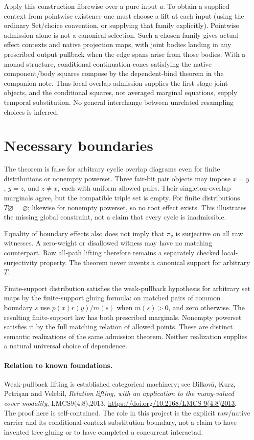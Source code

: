 \documentclass[11pt]{article}
\begin{document}
Apply this construction fibrewise over a pure input $a$. To obtain a supplied context from pointwise existence one must choose a lift at each input (using the ordinary Set/choice convention, or supplying that family explicitly). Pointwise admission alone is not a canonical selection. Such a chosen family gives actual effect contexts and native projection maps, with joint bodies landing in any prescribed output pullback when the edge spans arise from those bodies. With a monad structure, conditional continuation cones satisfying the native component/body squares compose by the dependent-bind theorem in the companion note. Thus local overlap admission supplies the first-stage joint objects, and the conditional squares, not averaged marginal equations, supply temporal substitution. No general interchange between unrelated resampling choices is inferred.

\section{Necessary boundaries}
The theorem is false for arbitrary cyclic overlap diagrams even for finite distributions or nonempty powerset. Three fair-bit pair objects may impose $x=y$, $y=z$, and $z\ne x$, each with uniform allowed pairs. Their singleton-overlap marginals agree, but the compatible triple set is empty. For finite distributions $T\varnothing=\varnothing$; likewise for nonempty powerset, so no root effect exists. This illustrates the missing global constraint, not a claim that every cycle is inadmissible.

Equality of boundary effects also does not imply that $\pi_v$ is surjective on all raw witnesses. A zero-weight or disallowed witness may have no matching counterpart. Raw all-path lifting therefore remains a separately checked local-surjectivity property. The theorem never invents a canonical support for arbitrary $T$.

Finite-support distribution satisfies the weak-pullback hypothesis for arbitrary set maps by the finite-support gluing formula: on matched pairs of common boundary $s$ use $p(x)r(y)/m(s)$ when $m(s)>0$, and zero otherwise. The resulting finite-support law has both prescribed marginals. Nonempty powerset satisfies it by the full matching relation of allowed points. These are distinct semantic realizations of the same admission theorem. Neither realization supplies a natural universal choice of dependence.

\paragraph{Relation to known foundations.} Weak-pullback lifting is established categorical machinery; see B\'ilkov\'a, Kurz, Petri\c{s}an and Velebil, \emph{Relation lifting, with an application to the many-valued cover modality}, LMCS9(4:8),2013, \url{https://doi.org/10.2168/LMCS-9(4:8)2013}. The proof here is self-contained. The role in this project is the explicit raw/native carrier and its conditional-context substitution boundary, not a claim to have invented tree gluing or to have completed a concurrent interactad.
\end{document}
